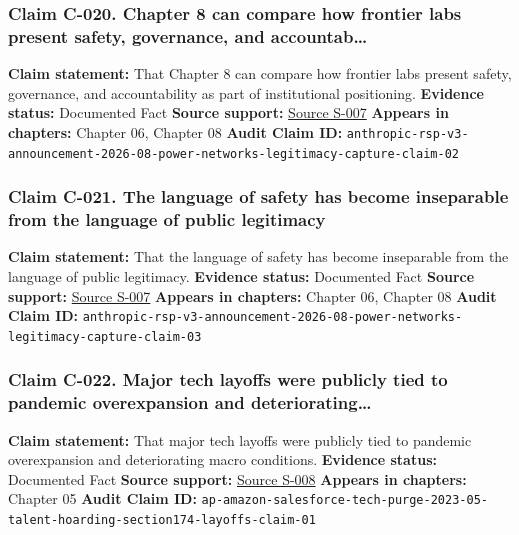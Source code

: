 \documentclass[
  american,
  11pt,
  letterpaper,
]{article}
\begin{document}
\subsubsection{Claim C-020. Chapter 8 can compare how frontier labs
present safety, governance, and
accountab\ldots{}}\label{claim-c-020-chapter-8-can-compare-how-frontier-labs-present-safety-governance-and-accountab}

\textbf{Claim statement:} That Chapter 8 can compare how frontier labs
present safety, governance, and accountability as part of institutional
positioning. \textbf{Evidence status:} Documented Fact \textbf{Source
support:}
\hyperref[source-s-007-responsible-scaling-policy-version-3-0]{Source
S-007} \textbf{Appears in chapters:} Chapter 06, Chapter 08
\textbf{Audit Claim ID:}
\texttt{anthropic-rsp-v3-announcement-2026-08-power-networks-legitimacy-capture-claim-02}

\subsubsection{Claim C-021. The language of safety has become
inseparable from the language of public
legitimacy}\label{claim-c-021-the-language-of-safety-has-become-inseparable-from-the-language-of-public-legitimacy}

\textbf{Claim statement:} That the language of safety has become
inseparable from the language of public legitimacy. \textbf{Evidence
status:} Documented Fact \textbf{Source support:}
\hyperref[source-s-007-responsible-scaling-policy-version-3-0]{Source
S-007} \textbf{Appears in chapters:} Chapter 06, Chapter 08
\textbf{Audit Claim ID:}
\texttt{anthropic-rsp-v3-announcement-2026-08-power-networks-legitimacy-capture-claim-03}

\subsubsection{Claim C-022. Major tech layoffs were publicly tied to
pandemic overexpansion and
deteriorating\ldots{}}\label{claim-c-022-major-tech-layoffs-were-publicly-tied-to-pandemic-overexpansion-and-deteriorating}

\textbf{Claim statement:} That major tech layoffs were publicly tied to
pandemic overexpansion and deteriorating macro conditions.
\textbf{Evidence status:} Documented Fact \textbf{Source support:}
\hyperref[source-s-008-amazon-salesforce-jettison-jobs-in-latest-tech-worker-purge]{Source
S-008} \textbf{Appears in chapters:} Chapter 05 \textbf{Audit Claim ID:}
\texttt{ap-amazon-salesforce-tech-purge-2023-05-talent-hoarding-section174-layoffs-claim-01}
\end{document}
